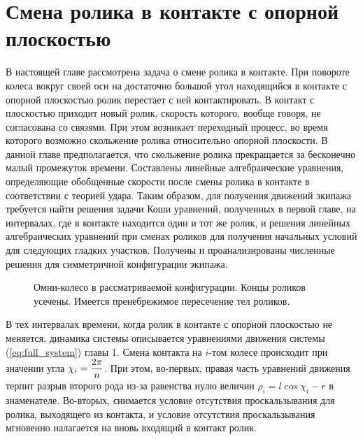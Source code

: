 \chapter{Смена ролика в контакте с опорной плоскостью}


В настоящей главе рассмотрена задача о смене ролика в контакте. При повороте колеса вокруг своей оси на достаточно большой угол находящийся в контакте с опорной плоскостью ролик перестает с ней контактировать. В контакт с плоскостью приходит новый ролик, скорость которого, вообще говоря, не согласована со связями. При этом возникает переходный процесс, во время которого возможно скольжение ролика относительно опорной плоскости.  В данной главе предполагается, что скольжение ролика прекращается за бесконечно малый промежуток времени. Составлены линейные алгебраические уравнения, определяющие обобщенные скорости после смены ролика в контакте в соответствии с теорией удара. Таким образом, для получения движений экипажа требуется найти решения задачи Коши уравнений, полученных в первой главе, на интервалах, где в контакте находится один и тот же ролик, и решения линейных алгебраических уравнений при сменах роликов для получения начальных условий для следующих гладких участков. Получены и проанализированы численные решения для симметричной конфигурации экипажа.

\begin{figure}
    \minipage{\textwidth}
        \centering
        \caption{Омни-колесо в рассматриваемой конфигурации. Концы роликов усечены. Имеется пренебрежимое пересечение тел роликов.}
        \label{fig:overlap}
    \endminipage
\end{figure}

В тех интервалах времени, когда ролик в контакте с опорной плоскостью не меняется, динамика системы описывается уравнениями движения системы (\ref{eq:full_system}) главы 1. Смена контакта на $i$-том колесе происходит при значении угла $\chi_i = \displaystyle\frac{\displaystyle 2\pi}{\displaystyle n}$. При этом, во-первых, правая часть уравнений движения терпит разрыв второго рода из-за равенства нулю величин $\rho_i = l\cos\chi_i-r$ в знаменателе. Во-вторых, снимается условие отсутствия проскальзывания для ролика, выходящего из контакта, и условие отсутствия проскальзывания мгновенно налагается на вновь входящий в контакт ролик.

